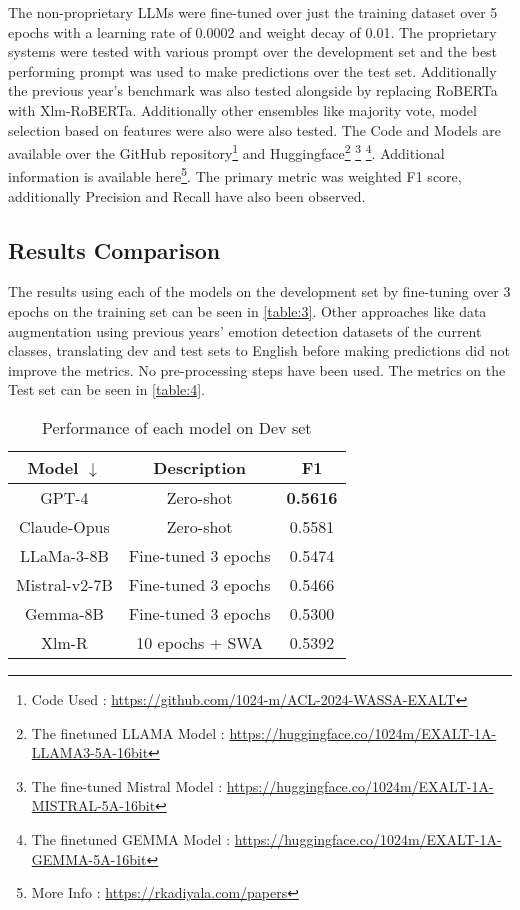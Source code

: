 \documentclass[11pt]{article}
\begin{document}
The non-proprietary LLMs were fine-tuned over just the training dataset over 5 epochs with a learning rate of 0.0002 and weight decay of 0.01. The proprietary systems were tested with various prompt over the development set and the best performing prompt was used to make predictions over the test set. Additionally the previous year's benchmark was also tested alongside by replacing RoBERTa\citep{liu2019roberta} with Xlm-RoBERTa\citep{conneau2020unsupervised}. Additionally other ensembles like majority vote, model selection based on features were also were also tested. The Code and Models are available over the GitHub repository\footnote{Code Used : \url{https://github.com/1024-m/ACL-2024-WASSA-EXALT}} and Huggingface\footnote{The finetuned LLAMA Model : \url{https://huggingface.co/1024m/EXALT-1A-LLAMA3-5A-16bit}} \footnote{The fine-tuned Mistral Model : \url{https://huggingface.co/1024m/EXALT-1A-MISTRAL-5A-16bit}} \footnote{The finetuned GEMMA Model : \url{https://huggingface.co/1024m/EXALT-1A-GEMMA-5A-16bit}}. Additional information is available here\footnote{More Info : \url{https://rkadiyala.com/papers}}.  The primary metric was weighted F1 score, additionally Precision and Recall have also been observed.


\subsection{Results Comparison}
The results using each of the models on the development set by fine-tuning over 3 epochs on the training set can be seen in \autoref{table:3}. Other approaches like data augmentation using previous years' emotion detection datasets of the current classes, translating dev and test sets to English before making predictions did not improve the metrics. No pre-processing steps have been used. The metrics on the Test set can be seen in \autoref{table:4}.

\begin{table}[!ht]
    \centering
    \begin{tabular}{|c|c|c|}
    \hline
    \textbf{Model $\downarrow$} & \textbf{Description} & \textbf{F1} \\
    \hline
    GPT-4            & Zero-shot   & \textbf{0.5616}  \\
    Claude-Opus      & Zero-shot   & 0.5581  \\
    LLaMa-3-8B       & Fine-tuned 3 epochs & 0.5474  \\
    Mistral-v2-7B    & Fine-tuned 3 epochs & 0.5466 \\
    Gemma-8B         & Fine-tuned 3 epochs & 0.5300  \\
    \hline     
    Xlm-R            & 10 epochs + SWA & 0.5392  \\
    \hline     
    \end{tabular}
    \caption{Performance of each model on Dev set}
    \label{table:3}
\end{table}
\end{document}
